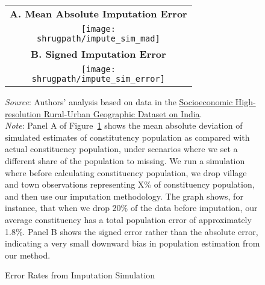 \documentclass[12pt,letterpaper]{article}
\newcommand{\panel}{\fontfamily{phv}\selectfont\scriptsize\textbf}
\newcommand{\shrugpath}{.}
\begin{document}
\begin{appendix}

\begin{figure}[H]
  \caption{Error Rates from Imputation Simulation}
  \begin{center}
  \begin{tabular}{c}
    \panel{A. Mean Absolute Imputation Error} \\
    \texttt{[image: \\shrugpath/impute\_sim\_mad]} \\
    \panel{B. Signed Imputation Error} \\
    \texttt{[image: \\shrugpath/impute\_sim\_error]} \\
  \end{tabular}
  
  \end{center}
  \begin{adjustwidth}{2cm}{2cm}
    \scriptsize{\textit{Source}: Authors' analysis based on data in
      the \href{http://www.devdatalab.org/shrug}{Socioeconomic
        High-resolution Rural-Urban Geographic Dataset on
        India}. \\ \textit{Note}: Panel A of
      Figure~\ref{fig:impute_error} shows the mean absolute deviation
      of simulated estimates of constitutency population as compared
      with actual constituency population, under scenarios where we
      set a different share of the population to missing. We run a
      simulation where before calculating constituency population, we
      drop village and town observations representing X\% of
      constituency population, and then use our imputation
      methodology. The graph shows, for instance, that when we drop
      20\% of the data before imputation, our average constituency has
      a total population error of approximately 1.8\%. Panel B shows
      the signed error rather than the absolute error, indicating a
      very small downward bias in population estimation from our
      method.}
  \end{adjustwidth}
  \label{fig:impute_error}
\end{figure}

\end{appendix}
  
\end{document}
